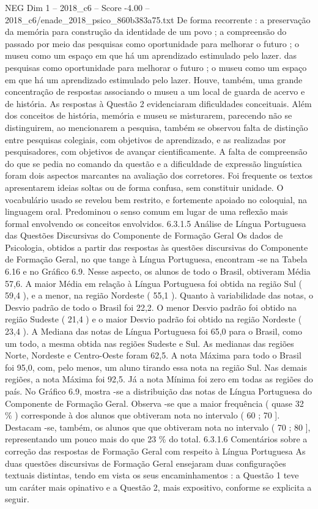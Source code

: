 \begin{textsample}{NEG Dim 1 – 2018\_c6 – Score -4.00 – 2018\_c6/enade\_2018\_psico\_860b383a75.txt}
De forma recorrente : a preservação da memória para construção da identidade de um povo ; a compreensão do passado por meio das pesquisas como oportunidade para melhorar o futuro ; o museu como um espaço em que há um aprendizado estimulado pelo lazer. das pesquisas como oportunidade para melhorar o futuro ; o museu como um espaço em que há um aprendizado estimulado pelo lazer.
Houve, também, uma grande concentração de respostas associando o museu a um local de guarda de acervo e de história.
As respostas à Questão 2 evidenciaram dificuldades conceituais.
Além dos conceitos de história, memória e museu se misturarem, parecendo não se distinguirem, ao mencionarem a pesquisa, também se observou falta de distinção entre pesquisas colegiais, com objetivos de aprendizado, e as realizadas por pesquisadores, com objetivos de avançar cientificamente.
A falta de compreensão do que se pedia no comando da questão e a dificuldade de expressão linguística foram dois aspectos marcantes na avaliação dos corretores.
Foi frequente os textos apresentarem ideias soltas ou de forma confusa, sem constituir unidade.
O vocabulário usado se revelou bem restrito, e fortemente apoiado no coloquial, na linguagem oral.
Predominou o senso comum em lugar de uma reflexão mais formal envolvendo os conceitos envolvidos. 6.3.1.5 Análise de Língua Portuguesa das Questões Discursivas do Componente de Formação Geral Os dados de Psicologia, obtidos a partir das respostas às questões discursivas do Componente de Formação Geral, no que tange à Língua Portuguesa, encontram -se na Tabela 6.16 e no Gráfico 6.9.
Nesse aspecto, os alunos de todo o Brasil, obtiveram Média 57,6.
A maior Média em relação à Língua Portuguesa foi obtida na região Sul ( 59,4 ), e a menor, na região Nordeste ( 55,1 ).
Quanto à variabilidade das notas, o Desvio padrão de todo o Brasil foi 22,2.
O menor Desvio padrão foi obtido na região Sudeste ( 21,4 ) e o maior Desvio padrão foi obtido na região Nordeste ( 23,4 ).
A Mediana das notas de Língua Portuguesa foi 65,0 para o Brasil, como um todo, a mesma obtida nas regiões Sudeste e Sul.
As medianas das regiões Norte, Nordeste e Centro-Oeste foram 62,5.
A nota Máxima para todo o Brasil foi 95,0, com, pelo menos, um aluno tirando essa nota na região Sul.
Nas demais regiões, a nota Máxima foi 92,5.
Já a nota Mínima foi zero em todas as regiões do país.
No Gráfico 6.9, mostra -se a distribuição das notas de Língua Portuguesa do Componente de Formação Geral.
Observa -se que a maior frequência ( quase 32 \% ) corresponde à dos alunos que obtiveram nota no intervalo ( 60 ; 70 ].
Destacam -se, também, os alunos que que obtiveram nota no intervalo ( 70 ; 80 ], representando um pouco mais do que 23 \% do total. 6.3.1.6 Comentários sobre a correção das respostas de Formação Geral com respeito à Língua Portuguesa As duas questões discursivas de Formação Geral ensejaram duas configurações textuais distintas, tendo em vista os seus encaminhamentos : a Questão 1 teve um caráter mais opinativo e a Questão 2, mais expositivo, conforme se explicita a seguir.

\end{textsample}
